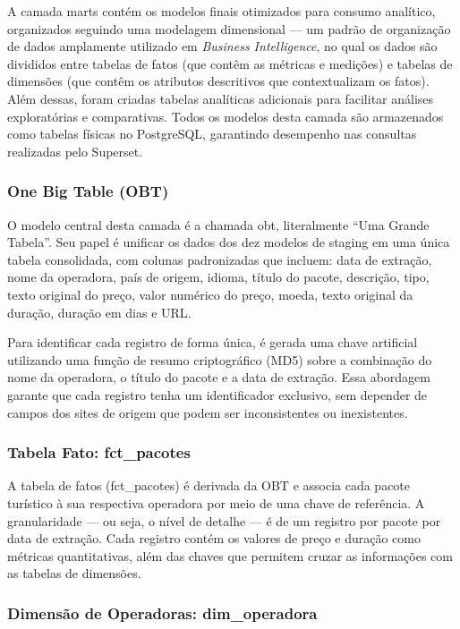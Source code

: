 A camada marts contém os modelos finais otimizados para consumo analítico, organizados
seguindo uma modelagem dimensional — um padrão de organização de dados amplamente
utilizado em \textit{Business Intelligence}, no qual os dados são divididos entre
tabelas de fatos (que contêm as métricas e medições) e tabelas de dimensões (que
contêm os atributos descritivos que contextualizam os fatos). Além dessas, foram
criadas tabelas analíticas adicionais para facilitar análises exploratórias e
comparativas. Todos os modelos desta camada são armazenados como tabelas físicas no
PostgreSQL, garantindo desempenho nas consultas realizadas pelo Superset.

\subsubsection{One Big Table (OBT)}

O modelo central desta camada é a chamada \ac{obt}, literalmente
``Uma Grande Tabela''. Seu papel é unificar os dados dos dez modelos de staging em uma
única tabela consolidada, com colunas padronizadas que incluem: data de extração, nome
da operadora, país de origem, idioma, título do pacote, descrição, tipo, texto original
do preço, valor numérico do preço, moeda, texto original da duração, duração em dias e
URL.

Para identificar cada registro de forma única, é gerada uma chave artificial
utilizando uma função de resumo criptográfico (MD5) sobre a combinação do nome da
operadora, o título do pacote e a data de extração. Essa abordagem garante que cada
registro tenha um identificador exclusivo, sem depender de campos dos sites de origem
que podem ser inconsistentes ou inexistentes.

\subsubsection{Tabela Fato: fct\_pacotes}

A tabela de fatos (fct\_pacotes) é derivada da OBT e associa cada pacote
turístico à sua respectiva operadora por meio de uma chave de referência. A
granularidade — ou seja, o nível de detalhe — é de um registro por pacote por data de
extração. Cada registro contém os valores de preço e duração como métricas
quantitativas, além das chaves que permitem cruzar as informações com as tabelas de
dimensões.

\subsubsection{Dimensão de Operadoras: dim\_operadora}

